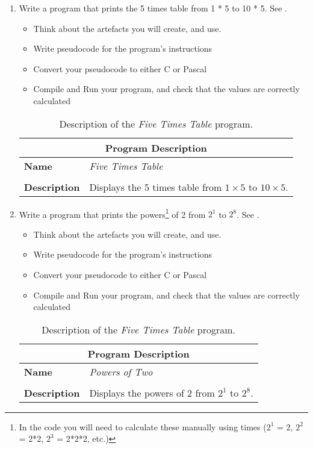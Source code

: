 \begin{enumerate}
  \item Write a program that prints the 5 times table from 1 * 5 to 10 * 5. See .
  \begin{itemize}
    \item Think about the artefacts you will create, and use.
    \item Write pseudocode for the program's instructions
    \item Convert your pseudocode to either C or Pascal
    \item Compile and Run your program, and check that the values are correctly calculated
  \end{itemize}
  
  \begin{table}[h]
  \centering
  \begin{tabular}{l|p{12cm}}
    \hline
    \multicolumn{2}{c}{\textbf{Program Description}} \\
    \hline
    \textbf{Name} & \emph{Five Times Table} \\
    \\
    \textbf{Description} & Displays the 5 times table from $1 \times 5$ to $10 \times 5$. \\
    \hline
  \end{tabular}
  \caption{Description of the \emph{Five Times Table} program.}
  \label{tbl:five-times}
  \end{table}
  
  
  \item Write a program that prints the powers\footnote{In the code you will need to calculate these manually using times ($2^1$ = 2, $2^2$ = 2*2, $2^3$ = 2*2*2, etc.)} of 2 from $2^1$ to $2^8$. See .
  \begin{itemize}
    \item Think about the artefacts you will create, and use.
    \item Write pseudocode for the program's instructions
    \item Convert your pseudocode to either C or Pascal
    \item Compile and Run your program, and check that the values are correctly calculated
  \end{itemize}
  
  \begin{table}[h]
  \centering
  \begin{tabular}{l|p{12cm}}
    \hline
    \multicolumn{2}{c}{\textbf{Program Description}} \\
    \hline
    \textbf{Name} & \emph{Powers of Two} \\
    \\
    \textbf{Description} & Displays the powers of 2 from $2^{1}$ to $2^{8}$. \\
    \hline
  \end{tabular}
  \caption{Description of the \emph{Five Times Table} program.}
  \label{tbl:two-powers}
  \end{table}
  

\end{enumerate}
